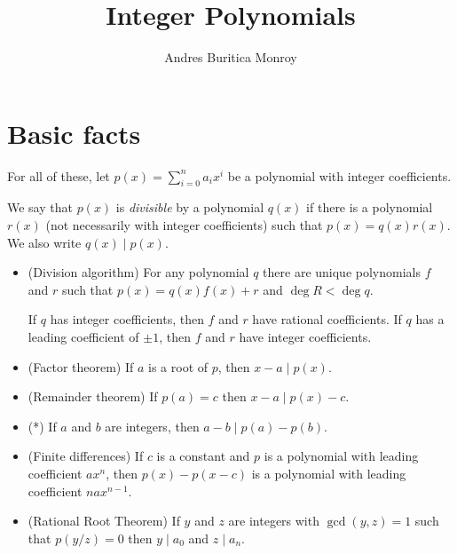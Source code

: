 \documentclass{article}
\title{Integer Polynomials}
\author{Andres Buritica Monroy}
\date{}
\begin{document}
\maketitle
\section{Basic facts}
For all of these, let $p(x)=\sum_{i=0}^n a_i x^i$ be a polynomial with integer
coefficients. 

We say that $p(x)$ is \emph{divisible} by a polynomial $q(x)$ if there is a
polynomial $r(x)$ (not necessarily with integer coefficients) such that
$p(x)=q(x)r(x)$. We also write $q(x)\mid p(x)$.
\begin{itemize}
  \item (Division algorithm) For any polynomial $q$ there are unique
    polynomials $f$ and $r$ such that $p(x)=q(x)f(x)+r$ and $\deg R<\deg q$.

    If $q$ has integer coefficients, then $f$ and $r$ have rational
    coefficients. If $q$ has a leading coefficient of $\pm 1$, then $f$ and $r$
    have integer coefficients.
  \item (Factor theorem) If $a$ is a root of $p$, then $x-a\mid p(x)$.
  \item (Remainder theorem) If $p(a)=c$ then $x-a\mid p(x)-c$.
  \item (*) If $a$ and $b$ are integers, then $a-b\mid p(a)-p(b)$.
  \item (Finite differences) If $c$ is a constant and $p$ is a polynomial with
    leading coefficient $ax^n$, then $p(x)-p(x-c)$ is a polynomial with
    leading coefficient $nax^{n-1}$.
  \item (Rational Root Theorem) If $y$ and $z$ are integers with $\gcd(y,z)=1$
    such that $p(y/z)=0$ then $y\mid a_0$ and $z\mid a_n$.
\end{itemize}
\end{document}
